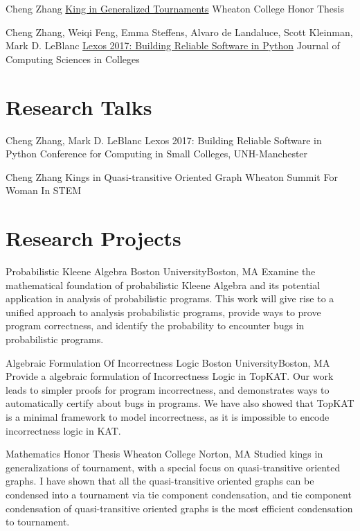 \documentclass[11pt,roman]{moderncv}        %
\begin{document}
{Cheng Zhang}
{\href{http://hdl.handle.net/11040/24570}{King in Generalized Tournaments}}
{Wheaton College Honor Thesis}
{}{}

{Cheng Zhang, Weiqi Feng, Emma Steffens, Alvaro de Landaluce, Scott Kleinman, Mark D. LeBlanc}
{\href{https://dl.acm.org/doi/10.5555/3205191.3205205}{Lexos 2017: Building Reliable Software in Python}}
{Journal of Computing Sciences in Colleges}
{}{}


\section{Research Talks}

{Cheng Zhang, Mark D. LeBlanc}
{Lexos 2017: Building Reliable Software in Python}
{Conference for Computing in Small Colleges, UNH-Manchester}
{}{}

{Cheng Zhang}
{Kings in Quasi-transitive Oriented Graph}
{Wheaton Summit For Woman In STEM}
{}{}


\section{Research Projects}

{Probabilistic Kleene Algebra}
{Boston University}{Boston, MA}{}
{Examine the mathematical foundation of probabilistic Kleene Algebra 
and its potential application in analysis of probabilistic programs.
This work will give rise to a unified approach to analysis probabilistic programs,
provide ways to prove program correctness, 
and identify the probability to encounter bugs in probabilistic programs.}

{Algebraic Formulation Of Incorrectness Logic}
{Boston University}{Boston, MA}{}
{Provide a algebraic formulation of Incorrectness Logic in TopKAT.
Our work leads to simpler proofs for program incorrectness, 
and demonstrates ways to automatically certify about bugs in programs.
We have also showed that TopKAT is a minimal framework to model incorrectness,
as it is impossible to encode incorrectness logic in KAT.
}

{Mathematics Honor Thesis}
{Wheaton College} {Norton, MA}{}
{Studied kings in generalizations of tournament,
with a special focus on quasi-transitive oriented graphs.
I have shown that all the quasi-transitive oriented graphs
can be condensed into a tournament via tie component condensation, 
and tie component condensation of quasi-transitive 
oriented graphs is the most efficient condensation to tournament.
}
\end{document}
